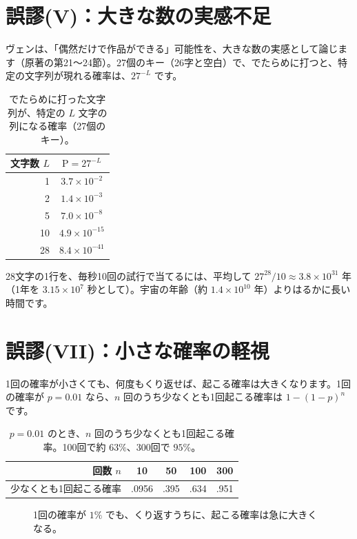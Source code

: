 \documentclass[a4paper,11pt,openany]{ltjsbook}
\newcommand{\Prob}{\mathrm{P}}
\begin{document}
\section{誤謬(V)：大きな数の実感不足}

ヴェンは、「偶然だけで作品ができる」可能性を、大きな数の実感として論じます（原著の第21〜24節）。27個のキー（26字と空白）で、でたらめに打つと、特定の文字列が現れる確率は、$27^{-L}$ です。

\begin{table}[htbp]
\centering
\begin{tabular}{r|c}
\toprule
文字数 $L$ & $\Prob=27^{-L}$\\
\midrule
1 & $3.7\times10^{-2}$\\
2 & $1.4\times10^{-3}$\\
5 & $7.0\times10^{-8}$\\
10 & $4.9\times10^{-15}$\\
28 & $8.4\times10^{-41}$\\
\bottomrule
\end{tabular}
\caption{でたらめに打った文字列が、特定の $L$ 文字の列になる確率（27個のキー）。}
\end{table}

28文字の1行を、毎秒10回の試行で当てるには、平均して $27^{28}/10\approx3.8\times10^{31}$ 年（1年を $3.15\times10^{7}$ 秒として）。宇宙の年齢（約 $1.4\times10^{10}$ 年）よりはるかに長い時間です。

\section{誤謬(VII)：小さな確率の軽視}

1回の確率が小さくても、何度もくり返せば、起こる確率は大きくなります。1回の確率が $p=0.01$ なら、$n$ 回のうち少なくとも1回起こる確率は $1-(1-p)^n$ です。

\begin{table}[htbp]
\centering
\begin{tabular}{r|cccc}
\toprule
回数 $n$ & 10 & 50 & 100 & 300\\
\midrule
少なくとも1回起こる確率 & .0956 & .395 & .634 & .951\\
\bottomrule
\end{tabular}
\caption{$p=0.01$ のとき、$n$ 回のうち少なくとも1回起こる確率。100回で約 $63\%$、300回で $95\%$。}
\end{table}

\begin{figure}[htbp]
\centering
{}
\caption{1回の確率が $1\%$ でも、くり返すうちに、起こる確率は急に大きくなる。}
\end{figure}
\end{document}
